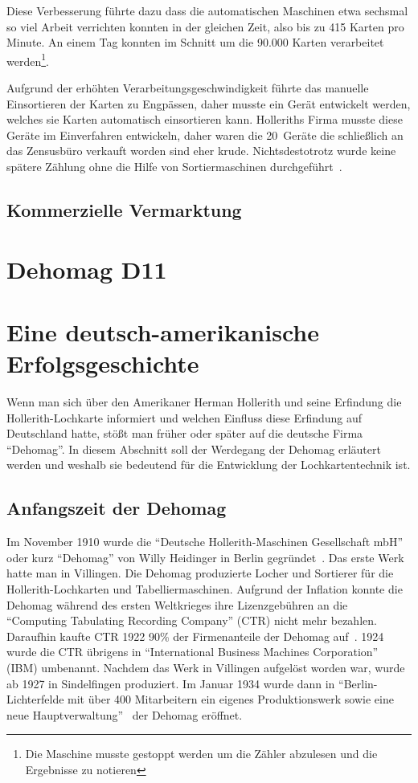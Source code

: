 \documentclass[parskip=half]{scrartcl}
\begin{document}
Diese Verbesserung führte dazu dass die automatischen Maschinen etwa sechsmal
so viel Arbeit verrichten konnten in der gleichen Zeit, also bis zu 415 Karten
pro Minute. An einem Tag konnten im Schnitt um die 90.000 Karten verarbeitet
werden\footnote{Die Maschine musste gestoppt werden um die Zähler abzulesen und
die Ergebnisse zu notieren}.

Aufgrund der erhöhten Verarbeitungsgeschwindigkeit führte das manuelle
Einsortieren der Karten zu Engpässen, daher musste ein Gerät entwickelt werden,
welches sie Karten automatisch einsortieren kann. Holleriths Firma musste diese
Geräte im Einverfahren entwickeln, daher waren die 20~Geräte die schließlich an
das Zensusbüro verkauft worden sind eher krude. Nichtsdestotrotz wurde keine
spätere Zählung ohne die Hilfe von Sortiermaschinen
durchgeführt~\cite{truesdell1965development}.

\subsection{Kommerzielle Vermarktung}
\label{sec:commerce}

\section{Dehomag D11}
\label{sec:d11}


\section{Eine deutsch-amerikanische Erfolgsgeschichte}

Wenn man sich über den Amerikaner Herman Hollerith und seine Erfindung die
Hollerith-Lochkarte informiert und welchen Einfluss diese Erfindung auf
Deutschland hatte, stößt man früher oder später auf die deutsche Firma
\enquote{Dehomag}. In diesem Abschnitt soll der Werdegang der Dehomag erläutert
werden und weshalb sie bedeutend  für die Entwicklung der Lochkartentechnik
ist.

\subsection{Anfangszeit der Dehomag}

Im November 1910 wurde die \enquote{Deutsche Hollerith-Maschinen Gesellschaft
mbH} oder kurz \enquote{Dehomag} von Willy Heidinger in Berlin
gegründet~\cite{dingwerth}. Das erste Werk hatte man in Villingen. Die Dehomag
produzierte Locher und Sortierer für die Hollerith-Lochkarten und
Tabelliermaschinen. Aufgrund der Inflation konnte die Dehomag während des
ersten Weltkrieges ihre Lizenzgebühren an die \enquote{Computing Tabulating
Recording Company} (CTR) nicht mehr bezahlen.  Daraufhin kaufte CTR 1922 90\%
der Firmenanteile der Dehomag auf~\cite{restloseErfassung}. 1924 wurde die CTR
übrigens in \enquote{International Business Machines Corporation} (IBM)
umbenannt. Nachdem das Werk in Villingen aufgelöst worden war, wurde ab 1927 in
Sindelfingen produziert. Im Januar 1934 wurde dann in
\enquote{Berlin-Lichterfelde mit über 400 Mitarbeitern ein eigenes
Produktionswerk sowie eine neue Hauptverwaltung}~\cite{dingwerth} der Dehomag
eröffnet.
\end{document}

